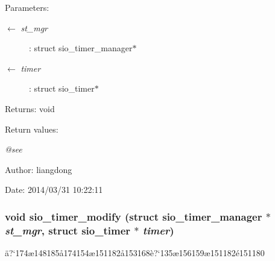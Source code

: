 \begin{Desc}
\item[Parameters:]
\begin{description}
\item[\mbox{$\leftarrow$} {\em st\_\-mgr}]: struct sio\_\-timer\_\-manager$\ast$ \item[\mbox{$\leftarrow$} {\em timer}]: struct sio\_\-timer$\ast$ \end{description}
\end{Desc}
\begin{Desc}
\item[Returns:]void \end{Desc}
\begin{Desc}
\item[Return values:]
\begin{description}
\item[{\em @see}]\end{description}
\end{Desc}
\begin{Desc}
\item[Author:]liangdong \end{Desc}
\begin{Desc}
\item[Date:]2014/03/31 10:22:11 \end{Desc}
\subsubsection{\setlength{\rightskip}{0pt plus 5cm}void sio\_\-timer\_\-modify (struct sio\_\-timer\_\-manager $\ast$ {\em st\_\-mgr}, struct sio\_\-timer $\ast$ {\em timer})}\label{sio__timer_8c_a10}


\"{a}?`174\ae{}148185\aa{}174154\ae{}151182\aa{}153168\`{e}?`135\ae{}156159\ae{}151182\'{e}151180 

